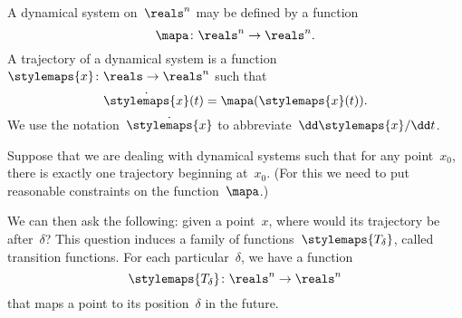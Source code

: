 \label{exa:transition-functions}
\begin{definition}
    \label{def:ct-dynsyst}
    A dynamical system on~$\reals^n$ may be defined by a function
    \begin{equation}
        \mapa \colon \reals^n \to \reals^n.
    \end{equation}
    A trajectory of a dynamical system is a function~$\stylemaps{x}\colon \reals \to \reals^n$ such that
    \begin{equation}
        \dot{\stylemaps{x}}(t) = \mapa(\stylemaps{x}(t)).
    \end{equation}
    We use the notation~$\dot{\stylemaps{x}}$ to abbreviate~$\dd \stylemaps{x} / \dd t$.
\end{definition}

Suppose that we are dealing with dynamical systems such that for any point~$x_0$, there is exactly one trajectory beginning at~$x_0$.
(For this we need to put reasonable constraints on the function~$\mapa$.)

We can then ask the following: given a point~$x$, where would its trajectory be after~$\delta$?
This question induces a family of functions~$\stylemaps{T_\delta}$, called transition functions.
For each particular~$\delta$, we have a function
\begin{equation}
    \stylemaps{T_{\delta}}\colon \reals^n \to  \reals^n
\end{equation}
that maps a point to its position~$\delta$ in the future.

